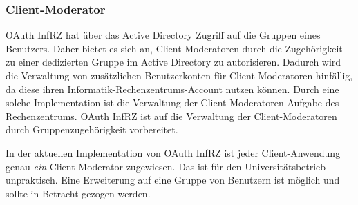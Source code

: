 \documentclass[12pt,a4paper,pointednumbers,abstracton]{scrartcl}
\begin{document}
\subsubsection{Client-Moderator}
\label{sec:oauth-infrz/moderator}

OAuth InfRZ hat über das Active Directory Zugriff auf die Gruppen eines Benutzers.
Daher bietet es sich an, Client-Moderatoren durch die Zugehörigkeit zu einer dedizierten Gruppe im Active Directory zu autorisieren.
Dadurch wird die Verwaltung von zusätzlichen Benutzerkonten für Client-Moderatoren hinfällig, da diese ihren Informatik-Rechenzentrums-Account nutzen können.
Durch eine solche Implementation ist die Verwaltung der Client-Moderatoren Aufgabe des Rechenzentrums.
OAuth InfRZ ist auf die Verwaltung der Client-Moderatoren durch Gruppenzugehörigkeit vorbereitet.

In der aktuellen Implementation von OAuth InfRZ ist jeder Client-Anwendung genau \emph{ein} Client-Moderator zugewiesen.
Das ist für den Universitätsbetrieb unpraktisch.
Eine Erweiterung auf eine Gruppe von Benutzern ist möglich und sollte in Betracht gezogen werden.
\end{document}
